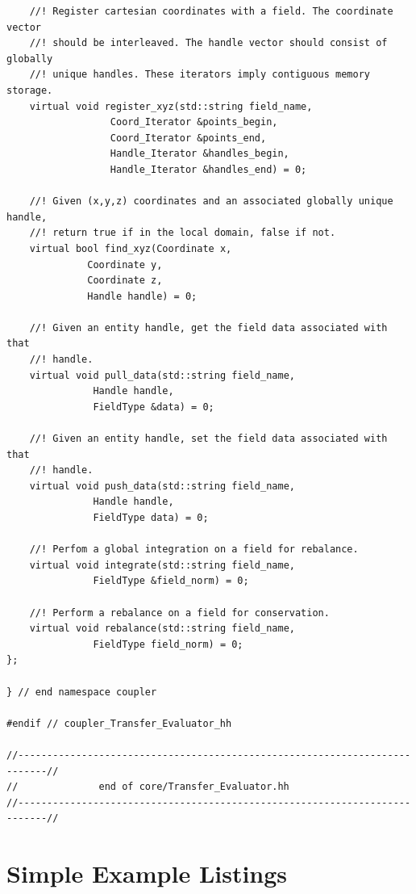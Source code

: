 \documentclass[letterpaper]{article}
\begin{document}
\begin{lstlisting}
    //! Register cartesian coordinates with a field. The coordinate vector
    //! should be interleaved. The handle vector should consist of globally
    //! unique handles. These iterators imply contiguous memory storage.
    virtual void register_xyz(std::string field_name,
			      Coord_Iterator &points_begin,
			      Coord_Iterator &points_end,
			      Handle_Iterator &handles_begin,
			      Handle_Iterator &handles_end) = 0;

    //! Given (x,y,z) coordinates and an associated globally unique handle,
    //! return true if in the local domain, false if not.
    virtual bool find_xyz(Coordinate x, 
			  Coordinate y,
			  Coordinate z,
			  Handle handle) = 0;

    //! Given an entity handle, get the field data associated with that
    //! handle.
    virtual void pull_data(std::string field_name,
			   Handle handle,
			   FieldType &data) = 0;

    //! Given an entity handle, set the field data associated with that
    //! handle.
    virtual void push_data(std::string field_name,
			   Handle handle, 
			   FieldType data) = 0;

    //! Perfom a global integration on a field for rebalance.
    virtual void integrate(std::string field_name,
			   FieldType &field_norm) = 0;

    //! Perform a rebalance on a field for conservation.
    virtual void rebalance(std::string field_name,
			   FieldType field_norm) = 0;
};

} // end namespace coupler

#endif // coupler_Transfer_Evaluator_hh

//---------------------------------------------------------------------------//
//              end of core/Transfer_Evaluator.hh
//---------------------------------------------------------------------------//
\end{lstlisting}

\section{Simple Example Listings}
\end{document}
